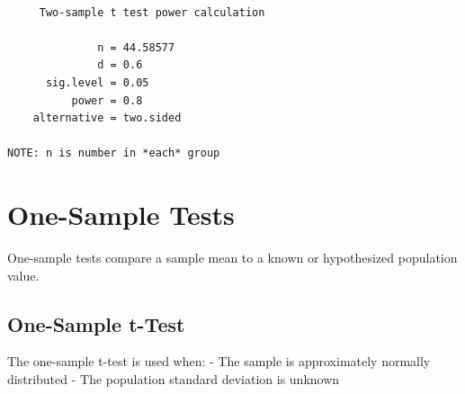 \documentclass[
  letterpaper,
]{book}
\begin{document}
\begin{verbatim}

     Two-sample t test power calculation 

              n = 44.58577
              d = 0.6
      sig.level = 0.05
          power = 0.8
    alternative = two.sided

NOTE: n is number in *each* group
\end{verbatim}

\section{One-Sample Tests}\label{one-sample-tests}

One-sample tests compare a sample mean to a known or hypothesized
population value.

\subsection{One-Sample t-Test}\label{one-sample-t-test}

The one-sample t-test is used when: - The sample is approximately
normally distributed - The population standard deviation is unknown
\end{document}
